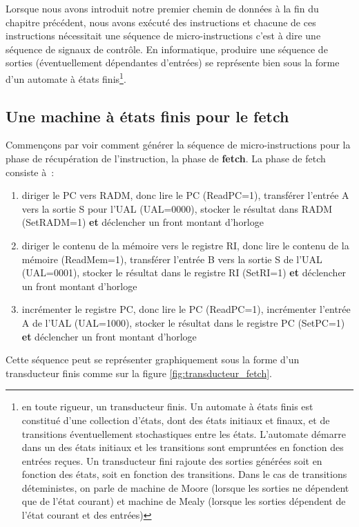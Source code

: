 Lorsque nous avons introduit notre premier chemin de données à la fin du chapitre précédent, nous avons exécuté des instructions et chacune de ces instructions nécessitait une séquence de micro-instructions c'est à dire une séquence de signaux de contrôle. En informatique, produire une séquence de sorties (éventuellement dépendantes d'entrées) se représente bien sous la forme d'un automate à états finis\footnote{en toute rigueur, un transducteur finis. Un automate à états finis est constitué d'une collection d'états, dont des états initiaux et finaux, et de transitions éventuellement stochastiques entre les états. L'automate démarre dans un des états initiaux et les transitions sont empruntées en fonction des entrées reçues. Un transducteur fini rajoute des sorties générées soit en fonction des états, soit en fonction des transitions. Dans le cas de transitions déteministes, on parle de machine de Moore (lorsque les sorties ne dépendent que de l'état courant) et machine de Mealy (lorsque les sorties dépendent de l'état courant et des entrées)}.

\subsection{Une machine à états finis pour le fetch}

Commençons par voir comment générer la séquence de micro-instructions pour la phase de récupération de l'instruction, la phase de \textbf{fetch}. La phase de fetch consiste à~:
\begin{enumerate}
\item diriger le PC vers RADM, donc lire le PC (ReadPC=1), transférer l'entrée A vers la sortie S pour l'UAL (UAL=0000), stocker le résultat dans RADM (SetRADM=1) \textbf{et} déclencher un front montant d'horloge
\item diriger le contenu de la mémoire vers le registre RI, donc lire le contenu de la mémoire (ReadMem=1), transférer l'entrée B vers la sortie S de l'UAL (UAL=0001), stocker le résultat dans le registre RI (SetRI=1) \textbf{et} déclencher un front montant d'horloge
\item incrémenter le registre PC, donc lire le PC (ReadPC=1), incrémenter l'entrée A de l'UAL (UAL=1000), stocker le résultat dans le registre PC (SetPC=1) \textbf{et} déclencher un front montant d'horloge
\end{enumerate}

Cette séquence peut se représenter graphiquement sous la forme d'un transducteur finis comme sur la figure \ref{fig:transducteur_fetch}.


